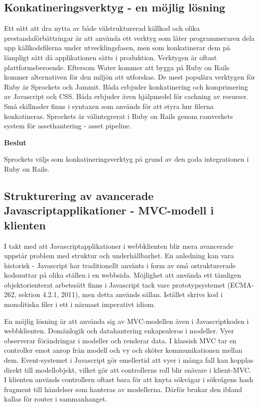 \subsection{Konkatineringsverktyg - en möjlig lösning}
Ett sätt att dra nytta av både välstrukturerad källkod och olika prestandaförbättringar är att använda ett verktyg som låter programmeraren dela upp källkodsfilerna under utvecklingsfasen, men som konkatinerar dem på lämpligt sätt då applikationen sätts i produktion. 
Verktygen är oftast plattformsberoende. Eftersom Water kommer att bygga på Ruby on Rails kommer alternativen för den miljön att utforskas. 
De mest populära verktygen för Ruby är Sprockets och Jammit. Båda erbjuder konkatinering och komprimering av Javascript och CSS. Båda erbjuder även hjälpmedel för cachning av resurser. Små skillnader finns i syntaxen som används för att styra hur filerna konkatineras.
Sprockets är välintegrerat i Ruby on Rails genom ramverkets system för assethantering - asset pipeline.

\begin{flushright}
  
  \textbf{Beslut}
  
  Sprockets väljs som konkatineringsverktyg på grund av den goda integrationen i Ruby on Rails.
  
\end{flushright}

\subsection{Strukturering av avancerade Javascriptapplikationer - MVC-modell i klienten}
I takt med att Javascriptapplikationer i webbklienten blir mera avancerade uppstår problem med struktur och underhållbarhet. En anledning kan vara historisk - Javascript har traditionellt använts i form av små ostrukturerade kodsnuttar på olika ställen i en webbsida. Möjlighet att använda ett tämligen objektorienterat arbetssätt finns i Javascript tack vare prototypsystemet (ECMA-262, sektion 4.2.1, 2011), men detta används sällan. Istället skrivs kod i monolitiska filer i ett i närmast imperativt idiom.

En möjlig lösning är att använda sig av MVC-modellen även i Javascriptkoden i webbklienten. Domänlogik och datahantering enkapsuleras i modeller. Vyer observerar förändringar i modeller och renderar data. I klassisk MVC tar en controller emot anrop från modell och vy och sköter kommunikationen mellan dem. Event-systemet i Javascript gör emellertid att vyer i många fall kan kopplas direkt till modellobjekt, vilket gör att controllerns roll blir snävare i klient-MVC. I klienten används controllern oftast bara för att knyta sökvägar i sökvägens hash fragment till händelser som hanteras av modellerna. Därför brukar den ibland kallas för router i sammanhanget.

